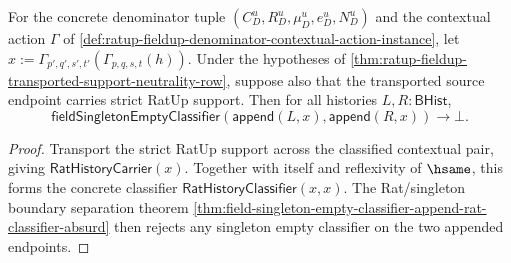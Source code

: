 \begin{theorem}
\label{thm:ratup-fieldup-transported-strict-support-singleton-classifier-exclusion}
For the concrete denominator tuple $(C_D^u,R_D^u,\mu_D^u,e_D^u,N_D^u)$ and the
contextual action $\Gamma$ of
\autoref{def:ratup-fieldup-denominator-contextual-action-instance}, let
$x:=\Gamma_{p',q',s',t'}(\Gamma_{p,q,s,t}(h))$. Under the hypotheses of
\autoref{thm:ratup-fieldup-transported-support-neutrality-row}, suppose also
that the transported source endpoint carries strict RatUp support. Then for all
histories $L,R:\mathsf{BHist}$,
$$
\mathsf{fieldSingletonEmptyClassifier}(\mathsf{append}(L,x),\mathsf{append}(R,x))
\to\bot.
$$
\end{theorem}
\begin{proof}
Transport the strict RatUp support across the classified contextual pair, giving
$\mathsf{RatHistoryCarrier}(x)$. Together with itself and reflexivity of
$\hsame$, this forms the concrete classifier
$\mathsf{RatHistoryClassifier}(x,x)$. The Rat/singleton boundary separation
theorem
\autoref{thm:field-singleton-empty-classifier-append-rat-classifier-absurd}
then rejects any singleton empty classifier on the two appended endpoints.
\end{proof}


